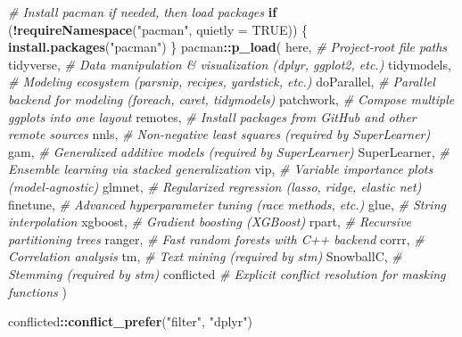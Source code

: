\documentclass[
]{book}
\newenvironment{Shaded}{\begin{snugshade}}{\end{snugshade}}
\newcommand{\AttributeTok}[1]{\textcolor[rgb]{0.13,0.29,0.53}{#1}}
\newcommand{\CommentTok}[1]{\textcolor[rgb]{0.56,0.35,0.01}{\textit{#1}}}
\newcommand{\ConstantTok}[1]{\textcolor[rgb]{0.56,0.35,0.01}{#1}}
\newcommand{\ControlFlowTok}[1]{\textcolor[rgb]{0.13,0.29,0.53}{\textbf{#1}}}
\newcommand{\FunctionTok}[1]{\textcolor[rgb]{0.13,0.29,0.53}{\textbf{#1}}}
\newcommand{\NormalTok}[1]{#1}
\newcommand{\SpecialCharTok}[1]{\textcolor[rgb]{0.81,0.36,0.00}{\textbf{#1}}}
\newcommand{\StringTok}[1]{\textcolor[rgb]{0.31,0.60,0.02}{#1}}
\begin{document}
\begin{Shaded}
\begin{Highlighting}[]
\CommentTok{\# Install pacman if needed, then load packages}
\ControlFlowTok{if}\NormalTok{ (}\SpecialCharTok{!}\FunctionTok{requireNamespace}\NormalTok{(}\StringTok{"pacman"}\NormalTok{, }\AttributeTok{quietly =} \ConstantTok{TRUE}\NormalTok{)) \{}
  \FunctionTok{install.packages}\NormalTok{(}\StringTok{"pacman"}\NormalTok{)}
\NormalTok{\}}
\NormalTok{pacman}\SpecialCharTok{::}\FunctionTok{p\_load}\NormalTok{(}
\NormalTok{  here,         }\CommentTok{\# Project‐root file paths}
\NormalTok{  tidyverse,    }\CommentTok{\# Data manipulation \& visualization (dplyr, ggplot2, etc.)}
\NormalTok{  tidymodels,   }\CommentTok{\# Modeling ecosystem (parsnip, recipes, yardstick, etc.)}
\NormalTok{  doParallel,   }\CommentTok{\# Parallel backend for modeling (foreach, caret, tidymodels)}
\NormalTok{  patchwork,    }\CommentTok{\# Compose multiple ggplots into one layout}
\NormalTok{  remotes,      }\CommentTok{\# Install packages from GitHub and other remote sources}
\NormalTok{  nnls,         }\CommentTok{\# Non{-}negative least squares (required by SuperLearner)}
\NormalTok{  gam,          }\CommentTok{\# Generalized additive models (required by SuperLearner)}
\NormalTok{  SuperLearner, }\CommentTok{\# Ensemble learning via stacked generalization}
\NormalTok{  vip,          }\CommentTok{\# Variable importance plots (model‐agnostic)}
\NormalTok{  glmnet,       }\CommentTok{\# Regularized regression (lasso, ridge, elastic net)}
\NormalTok{  finetune,     }\CommentTok{\# Advanced hyperparameter tuning (race methods, etc.)}
\NormalTok{  glue,         }\CommentTok{\# String interpolation}
\NormalTok{  xgboost,      }\CommentTok{\# Gradient boosting (XGBoost)}
\NormalTok{  rpart,        }\CommentTok{\# Recursive partitioning trees}
\NormalTok{  ranger,       }\CommentTok{\# Fast random forests with C++ backend}
\NormalTok{  corrr,        }\CommentTok{\# Correlation analysis}
\NormalTok{  tm,           }\CommentTok{\# Text mining (required by stm)}
\NormalTok{  SnowballC,    }\CommentTok{\# Stemming (required by stm)}
\NormalTok{  conflicted    }\CommentTok{\# Explicit conflict resolution for masking functions}
\NormalTok{)}

\NormalTok{conflicted}\SpecialCharTok{::}\FunctionTok{conflict\_prefer}\NormalTok{(}\StringTok{"filter"}\NormalTok{, }\StringTok{"dplyr"}\NormalTok{)}
\end{Highlighting}
\end{Shaded}
\end{document}

